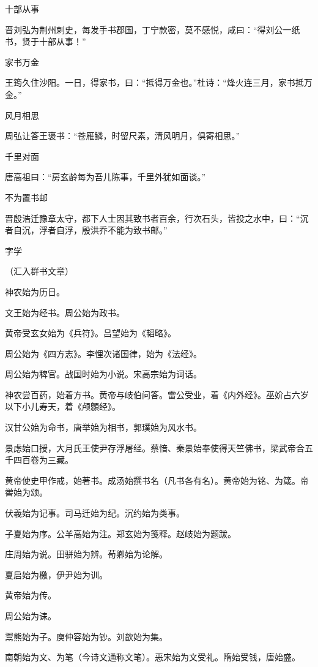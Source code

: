 \documentclass[a4paper,12pt,UTF8,twoside]{ctexbook}
\begin{document}
    十部从事
    
    晋刘弘为荆州刺史，每发手书郡国，丁宁款密，莫不感悦，咸曰：“得刘公一纸书，贤于十部从事！”
    
    家书万金
    
    王筠久住沙阳。一日，得家书，曰：“抵得万金也。”杜诗：“烽火连三月，家书抵万金。”
    
    风月相思
    
    周弘让答王褒书：“苍雁鳞，时留尺素，清风明月，俱寄相思。”
    
    千里对面
    
    唐高祖曰：“房玄龄每为吾儿陈事，千里外犹如面谈。”
    
    不为置书邮
    
    晋殷浩迁豫章太守，都下人士因其致书者百余，行次石头，皆投之水中，曰：“沉者自沉，浮者自浮，殷洪乔不能为致书邮。”
    
    字学
    
    （汇入群书文章）
    
    神农始为历日。
    
    文王始为经书。周公始为政书。
    
    黄帝受玄女始为《兵符》。吕望始为《韬略》。
    
    周公始为《四方志》。李悝次诸国律，始为《法经》。
    
    周公始为稗官。战国时始为小说。宋高宗始为词话。
    
    神农尝百药，始着方书。黄帝与岐伯问答。雷公受业，着《内外经》。巫妎占六岁以下小儿寿天，着《颅顖经》。
    
    汉甘公始为命书，唐举始为相书，郭璞始为风水书。
    
    景虑始口授，大月氏王使尹存浮屠经。蔡愔、秦景始奉使得天竺佛书，梁武帝合五千四百卷为三藏。
    
    黄帝使史甲作戒，始著书。成汤始撰书名（凡书各有名）。黄帝始为铭、为箴。帝喾始为颂。
    
    伏羲始为记事。司马迁始为纪。沉约始为类事。
    
    子夏始为序。公羊高始为注。郑玄始为笺释。赵岐始为题跋。
    
    庄周始为说。田骈始为辨。荀卿始为论解。
    
    夏启始为檄，伊尹始为训。
    
    黄帝始为传。
    
    周公始为诔。
    
    鬻熊始为子。庾仲容始为钞。刘歆始为集。
    
    南朝始为文、为笔（今诗文通称文笔）。恶宋始为文受礼。隋始受钱，唐始盛。
    
\end{document}

